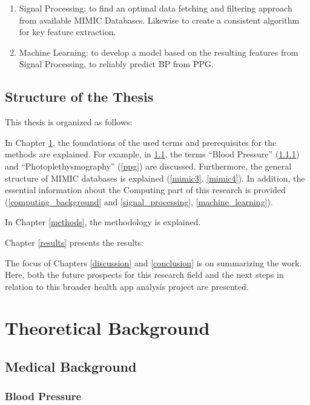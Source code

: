 \documentclass[12pt, bibliography=totoc]{scrartcl}
\begin{document}
\begin{enumerate}
\item Signal Processing: to find an optimal data fetching and filtering approach from available MIMIC Databases. Likewise to create a consistent algorithm for key feature extraction.
\item Machine Learning: to develop a model based on the resulting features from Signal Processing, to reliably predict BP from PPG. 
\end{enumerate}

\subsection{Structure of the Thesis}
\label{structure}

This thesis is organized as follows:

In Chapter \ref{background}, the foundations of the used terms and prerequisites for the methods are explained. For example, in \ref{med_background}, the terms \enquote{Blood Pressure} (\ref{bp}) and \enquote{Photoplethysmography} (\ref{ppg}) are discussed. Furthermore, the general structure of MIMIC databases is explained (\ref{mimic3}, \ref{mimic4}). In addition, the essential information about the Computing part of this research is provided (\ref{computing_background} and \ref{signal_processing}, \ref{machine_learning}).

In Chapter \ref{methods}, the methodology is explained.

Chapter \ref{results} presents the results:

The focus of Chapters \ref{discussion} and \ref{conclusion} is on summarizing the work. Here, both the future prospects for this research field and the next steps in relation to this broader health app analysis project are presented.

\section{Theoretical Background}
\label{background}

\subsection{Medical Background}
\label{med_background}

\subsubsection{Blood Pressure}
\label{bp}
\end{document}
